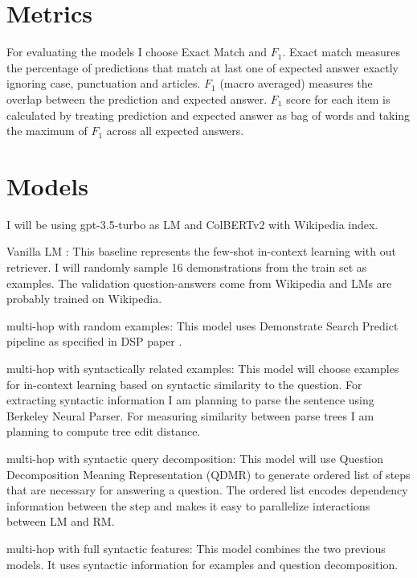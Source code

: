 \documentclass[11pt]{article}
\begin{document}
\section{Metrics} 

For evaluating the models I choose Exact Match and $F_{1}$. Exact match measures the percentage of predictions that match at last one of expected answer exactly ignoring case, punctuation and articles. $F_{1}$ (macro averaged) measures the overlap between the prediction and expected answer. $F_{1}$ score for each item is calculated by treating prediction and expected answer as bag of words and taking the maximum of $F_{1}$ across all expected answers. 

\section{Models} 

I will be using gpt-3.5-turbo as LM and ColBERTv2 with Wikipedia index.

Vanilla LM \cite{https://doi.org/10.48550/arxiv.2212.14024}: This baseline represents the few-shot in-context learning with out retriever. I will randomly sample 16 demonstrations from the train set as examples. The validation question-answers come from Wikipedia and LMs are probably trained on Wikipedia. 

multi-hop with random examples: This model uses Demonstrate Search Predict pipeline as specified in DSP paper \cite{https://doi.org/10.48550/arxiv.2212.14024}. 

multi-hop with syntactically related examples: This model will choose examples for in-context learning based on syntactic similarity to the question. For extracting syntactic information I am planning to parse the sentence using Berkeley Neural Parser\cite{kitaev-klein-2018-constituency}. For measuring similarity between parse trees I am planning to compute tree edit distance\cite{zhang_simple_1989}.

multi-hop with syntactic query decomposition: This model will use Question Decomposition Meaning Representation (QDMR)\cite{wolfson-etal-2020-break} to generate ordered list of steps that are necessary for answering a question. The ordered list encodes dependency information between the step and makes it easy to parallelize interactions between LM and RM. 

multi-hop with full syntactic features: This model combines the two previous models. It uses syntactic information for examples and question decomposition.
\end{document}
